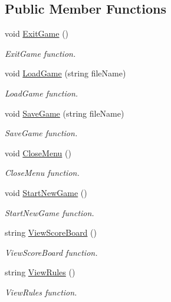 \subsection*{Public Member Functions}
\begin{DoxyCompactItemize}
\item 
void \mbox{\hyperlink{class_game_1_1_menu_logic_a615398aa76c650db2fa6a3f5fcf7e215}{Exit\+Game}} ()
\begin{DoxyCompactList}\small\item\em Exit\+Game function. \end{DoxyCompactList}\item 
void \mbox{\hyperlink{class_game_1_1_menu_logic_a10ee91edfc847eeb03576cf512212695}{Load\+Game}} (string file\+Name)
\begin{DoxyCompactList}\small\item\em Load\+Game function. \end{DoxyCompactList}\item 
void \mbox{\hyperlink{class_game_1_1_menu_logic_a01964f3a56734ce48d1e74ce3d47f246}{Save\+Game}} (string file\+Name)
\begin{DoxyCompactList}\small\item\em Save\+Game function. \end{DoxyCompactList}\item 
void \mbox{\hyperlink{class_game_1_1_menu_logic_adeb1e1749499593128d22ff14e9c3507}{Close\+Menu}} ()
\begin{DoxyCompactList}\small\item\em Close\+Menu function. \end{DoxyCompactList}\item 
void \mbox{\hyperlink{class_game_1_1_menu_logic_ae5471adcbafc9b50c4e2405dfa4c8688}{Start\+New\+Game}} ()
\begin{DoxyCompactList}\small\item\em Start\+New\+Game function. \end{DoxyCompactList}\item 
string \mbox{\hyperlink{class_game_1_1_menu_logic_a1dd2dae3ed7ea7bb1c156cb5e480cb02}{View\+Score\+Board}} ()
\begin{DoxyCompactList}\small\item\em View\+Score\+Board function. \end{DoxyCompactList}\item 
string \mbox{\hyperlink{class_game_1_1_menu_logic_a55ba09f791d6e1b2e510178d52ea3e50}{View\+Rules}} ()
\begin{DoxyCompactList}\small\item\em View\+Rules function. \end{DoxyCompactList}\end{DoxyCompactItemize}


